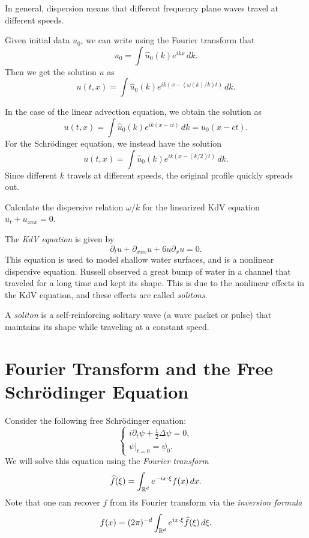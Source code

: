 \begin{remark}
  In general, dispersion means that different
  frequency plane waves travel at different speeds.
\end{remark}

\begin{remark}
  Given initial data $u_0$,
  we can write using the Fourier transform that
  \[
    u_0 = \int \widehat{u}_0(k) e^{ikx} \, dk.
  \]
  Then we get the solution $u$ as
  \[
    u(t, x) = \int \widehat{u}_0(k) e^{i k (x - (\omega(k) / k) t)} \, dk.
  \]
\end{remark}

\begin{example}
  In the case of the linear advection equation, we
  obtain the solution as
  \[
    u(t, x) = \int \widehat{u}_0(k) e^{i k (x - ct)} \, dk
    = u_0(x - ct).
  \]
  For the Schr\"odinger equation, we instead have
  the solution
  \[
    u(t, x) = \int \widehat{u}_0(k) e^{i k (x - (k / 2) t)} \, dk.
  \]
  Since different $k$ travels at different speeds,
  the original profile quickly spreads out.
\end{example}

\begin{exercise}
  Calculate the dispersive relation $\omega / k$
  for the linearized KdV equation $u_t + u_{xxx} = 0$.
\end{exercise}

\begin{example}
  The \emph{KdV equation} is given by
  \[
    \partial_t u + \partial_{xxx} u + 6 u \partial_x u = 0.
  \]
  This equation is used to model shallow water
  surfaces, and is a nonlinear dispersive
  equation. Russell observed a great bump of water
  in a channel that traveled for a long time
  and kept its shape. This is due to the
  nonlinear effects in the KdV equation, and these
  effects are called \emph{solitons}.
\end{example}

\begin{definition}
  A \emph{soliton} is a self-reinforcing solitary
  wave (a wave packet or pulse) that maintains
  its shape while traveling at a constant speed.
\end{definition}

\section{Fourier Transform and the Free Schr\"odinger Equation}
Consider the following free Schr\"odinger equation:
\[
  \begin{cases}
    i \partial_t \psi + \frac{1}{2} \Delta \psi = 0, \\
    \psi|_{t = 0} = \psi_0.
  \end{cases}
\]
We will solve this equation using the \emph{Fourier transform}
\[
  \widehat{f}(\xi) = \int_{\mathbb{R}^d} e^{-ix \cdot \xi} f(x)\, dx.
\]
Note that one can recover $f$ from its Fourier
transform via the \emph{inversion formula}
\[
  f(x) = (2\pi)^{-d} \int_{\mathbb{R}^d} e^{ix \cdot \xi} \widehat{f}(\xi)\, d\xi.
\]

